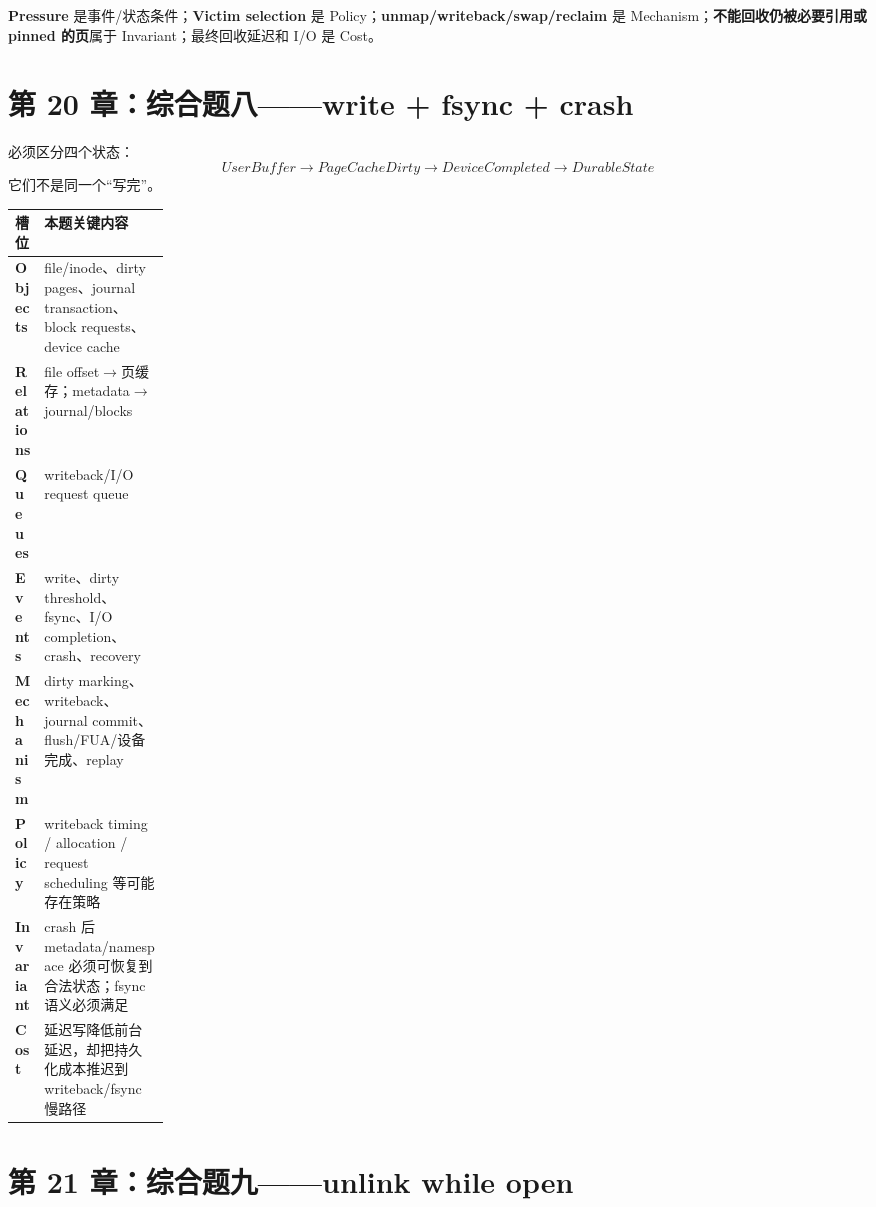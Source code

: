 \documentclass[11pt,a4paper]{ctexart}
\newcommand{\kw}[1]{\textbf{#1}}
\begin{document}
\begin{corebox}[最关键的分工]
\kw{Pressure} 是事件/状态条件；\kw{Victim selection} 是 Policy；\kw{unmap/writeback/swap/reclaim} 是 Mechanism；\kw{不能回收仍被必要引用或 pinned 的页}属于 Invariant；最终回收延迟和 I/O 是 Cost。
\end{corebox}

\section{第 20 章：综合题八——write + fsync + crash}

必须区分四个状态：
\[
\boxed{UserBuffer\rightarrow PageCacheDirty\rightarrow DeviceCompleted\rightarrow DurableState}
\]
它们不是同一个“写完”。

\begin{center}
\small
\begin{tabularx}{\linewidth}{>{\bfseries}p{0.18\linewidth} X}
\toprule
槽位 & 本题关键内容 \\
\midrule
Objects & file/inode、dirty pages、journal transaction、block requests、device cache \\
Relations & file offset$\to$页缓存；metadata$\to$journal/blocks \\
Queues & writeback/I/O request queue \\
Events & write、dirty threshold、fsync、I/O completion、crash、recovery \\
Mechanism & dirty marking、writeback、journal commit、flush/FUA/设备完成、replay \\
Policy & writeback timing / allocation / request scheduling 等可能存在策略 \\
Invariant & crash 后 metadata/namespace 必须可恢复到合法状态；fsync 语义必须满足 \\
Cost & 延迟写降低前台延迟，却把持久化成本推迟到 writeback/fsync 慢路径 \\
\bottomrule
\end{tabularx}
\end{center}

\section{第 21 章：综合题九——unlink while open}
\end{document}
